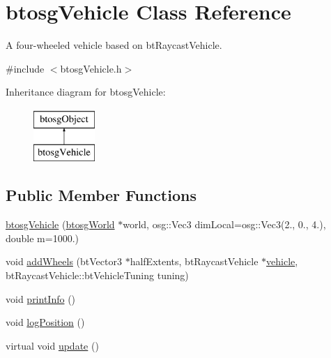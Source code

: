 \hypertarget{classbtosgVehicle}{}\section{btosg\+Vehicle Class Reference}
\label{classbtosgVehicle}


A four-\/wheeled vehicle based on bt\+Raycast\+Vehicle.  




{\ttfamily \#include $<$btosg\+Vehicle.\+h$>$}

Inheritance diagram for btosg\+Vehicle\+:\begin{figure}[H]
\begin{center}
\leavevmode
\includegraphics[height=2.000000cm]{classbtosgVehicle}
\end{center}
\end{figure}
\subsection*{Public Member Functions}
\begin{DoxyCompactItemize}
\item 
\hyperlink{classbtosgVehicle_a462222cde5a3480b8964b582fcbf39a3}{btosg\+Vehicle} (\hyperlink{classbtosgWorld}{btosg\+World} $\ast$world, osg\+::\+Vec3 dim\+Local=osg\+::\+Vec3(2., 0., 4.), double m=1000.)
\item 
void \hyperlink{classbtosgVehicle_a98971fb952c08cb72341a0c333fc66de}{add\+Wheels} (bt\+Vector3 $\ast$half\+Extents, bt\+Raycast\+Vehicle $\ast$\hyperlink{classbtosgVehicle_ac45b117f8b523f7040de99639deb7522}{vehicle}, bt\+Raycast\+Vehicle\+::bt\+Vehicle\+Tuning tuning)
\item 
void \hyperlink{classbtosgVehicle_abe98f64f0a8f37c7c0b244e3afbbcb15}{print\+Info} ()
\item 
void \hyperlink{classbtosgVehicle_ae9168c62263b26f95d068d94d6a7cab7}{log\+Position} ()
\item 
virtual void \hyperlink{classbtosgVehicle_a5fd0f471df492ac232c9b772a28bd2b9}{update} ()
\end{DoxyCompactItemize}
